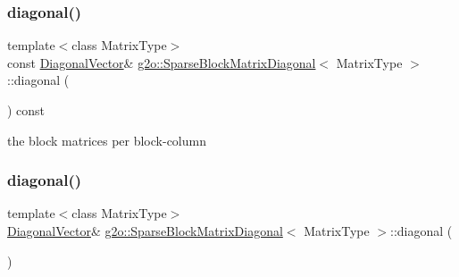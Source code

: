 \subsubsection{\texorpdfstring{diagonal()}{diagonal()}\hspace{0.1cm}{\footnotesize\ttfamily [1/2]}}
{\footnotesize\ttfamily template$<$class Matrix\+Type$>$ \\
const \mbox{\hyperlink{classg2o_1_1_sparse_block_matrix_diagonal_a2eb7fc4130fac5c499b57f3bec855812}{Diagonal\+Vector}}\& \mbox{\hyperlink{classg2o_1_1_sparse_block_matrix_diagonal}{g2o\+::\+Sparse\+Block\+Matrix\+Diagonal}}$<$ Matrix\+Type $>$\+::diagonal (\begin{DoxyParamCaption}{ }\end{DoxyParamCaption}) const\hspace{0.3cm}{\ttfamily [inline]}}



the block matrices per block-\/column 

\mbox{\label{classg2o_1_1_sparse_block_matrix_diagonal_af75593896065195f7dc2342132c565cc}} 
\subsubsection{\texorpdfstring{diagonal()}{diagonal()}\hspace{0.1cm}{\footnotesize\ttfamily [2/2]}}
{\footnotesize\ttfamily template$<$class Matrix\+Type$>$ \\
\mbox{\hyperlink{classg2o_1_1_sparse_block_matrix_diagonal_a2eb7fc4130fac5c499b57f3bec855812}{Diagonal\+Vector}}\& \mbox{\hyperlink{classg2o_1_1_sparse_block_matrix_diagonal}{g2o\+::\+Sparse\+Block\+Matrix\+Diagonal}}$<$ Matrix\+Type $>$\+::diagonal (\begin{DoxyParamCaption}{ }\end{DoxyParamCaption})\hspace{0.3cm}{\ttfamily [inline]}}

\mbox{\label{classg2o_1_1_sparse_block_matrix_diagonal_a04163c0b9be5658ef9e8be4ccc949e5f}} 
